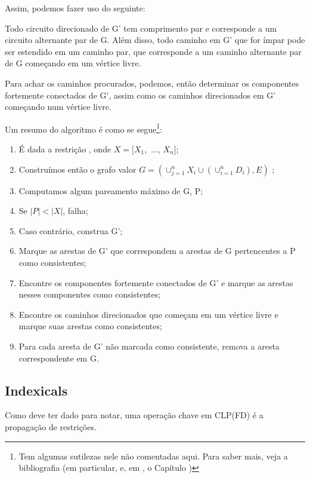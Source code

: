 Assim, podemos fazer uso do seguinte:

\begin{theorem}
  Todo circuito direcionado de G' tem comprimento par e corresponde a
  um circuito alternante par de G. Além disso, todo caminho em G' que
  for ímpar pode ser estendido em um caminho par, que corresponde a um
  caminho alternante par de G começando em um vértice livre.
\end{theorem}

Para achar os caminhos procurados, podemos, então determinar os
componentes fortemente conectados de G', assim como os caminhos
direcionados em G' começando num vértice livre.

Um resumo do algoritmo é como se segue\footnote{Tem algumas sutilezas
  nele não comentadas aqui. Para saber mais, veja a bibliografia (em
  particular, \cite{basileos} e, em \cite{cristo}, o Capítulo
  )}:

\begin{enumerate}
\item É dada a restrição , onde $X = [X_1,$
  ..., $X_n]$;
\item Construímos então o grafo valor $G =
  (\cup_{j=1}^nX_i\cup(\cup_{i=1}^nD_i),E)$ ;
\item Computamos algum pareamento máximo de G, P;
\item Se $|P| < |X|$, falha;
\item Caso contrário, construa G';
\item Marque as arestas de G' que correspondem a arestas de G
  pertencentes a P como consistentes;
\item Encontre os componentes fortemente conectados de G' e marque
  as arestas nesses componentes como consistentes;
\item Encontre os caminhos direcionados que começam em um vértice
  livre e marque suas arestas como consistentes;
\item Para cada aresta de G' não marcada como consistente, remova a
  aresta correspondente em G.
\end{enumerate}



\subsection{Indexicals}

Como deve ter dado para notar, uma operação chave em CLP(FD) é a
propagação de restrições.

